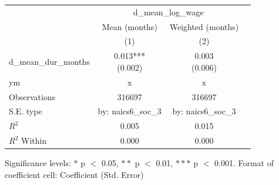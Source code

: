 \renewcommand\cellalign{t}
\begin{threeparttable}
\begin{tabular}{lccc}
\toprule
 & \multicolumn{2}{c}{d_mean_log_wage} \\
\cmidrule(lr){2-3} 
 & Mean (months) & Weighted (months) \\
 & (1) & (2) \\
\midrule
\addlinespace
d_mean_dur_months & \makecell{0.013*** \\ (0.002)} & \makecell{0.003 \\ (0.006)} \\
\midrule
\addlinespace
ym & x & x \\
\midrule
\addlinespace
Observations & 316697 & 316697 \\
S.E. type & by: naics6_soc_3 & by: naics6_soc_3 \\
$R^2$ & 0.005 & 0.015 \\
$R^2$ Within & 0.000 & 0.000 \\
\bottomrule
\end{tabular}
\footnotesize Significance levels: $*$ p $<$ 0.05, $**$ p $<$ 0.01, $***$ p $<$ 0.001. Format of coefficient cell: Coefficient 
 (Std. Error)
\end{threeparttable}